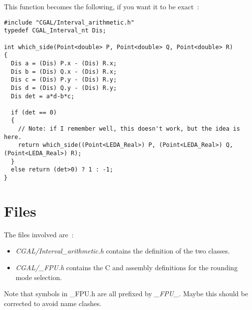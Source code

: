 \documentclass{book}
\begin{document}
This function becomes the following, if you want it to be exact~:

\begin{verbatim}
#include "CGAL/Interval_arithmetic.h"
typedef CGAL_Interval_nt Dis;

int which_side(Point<double> P, Point<double> Q, Point<double> R)
{
  Dis a = (Dis) P.x - (Dis) R.x;
  Dis b = (Dis) Q.x - (Dis) R.x;
  Dis c = (Dis) P.y - (Dis) R.y;
  Dis d = (Dis) Q.y - (Dis) R.y;
  Dis det = a*d-b*c;

  if (det == 0)
  {
    // Note: if I remember well, this doesn't work, but the idea is here.
    return which_side((Point<LEDA_Real>) P, (Point<LEDA_Real>) Q, (Point<LEDA_Real>) R);
  }
  else return (det>0) ? 1 : -1;
}
\end{verbatim}


\section{Files}

The files involved are~:
\begin{itemize}
\item {\it CGAL/Interval\_arithmetic.h} contains the definition of the
      two classes.
\item {\it CGAL/\_FPU.h} contains the C and assembly definitions for the
      rounding mode selection.
\end{itemize}

\bigskip

Note that symbols in \_FPU.h are all prefixed by {\it \_FPU\_}.  Maybe this
should be corrected to avoid name clashes.
\end{document}

